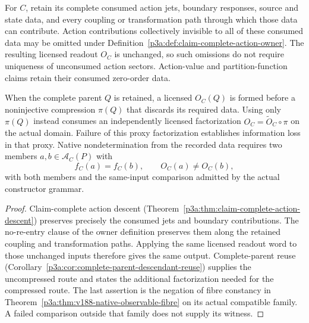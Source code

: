 \documentclass[12pt,a4paper]{article}
\begin{document}
\begin{corollary}
\label{p3a:cor:v188-claim-relative-completeness}
For $C$, retain its complete consumed action jets, boundary responses,
source and state data, and every coupling or transformation path through
which those data can contribute.  Action contributions collectively
invisible to all of these consumed data may be omitted under
Definition~\ref{p3a:def:claim-complete-action-owner}.  The resulting
licensed readout $O_C$ is unchanged, so such omissions do not require
uniqueness of unconsumed action sectors.  Action-value and partition-function
claims retain their consumed zero-order data.

When the complete parent $Q$ is retained, a licensed $O_C(Q)$ is formed
before a noninjective compression $\pi(Q)$ that discards its required data.
Using only $\pi(Q)$ instead consumes an independently licensed factorization
$O_C=\widetilde O_C\circ\pi$ on the actual domain.  Failure of this proxy
factorization establishes information loss in that proxy.  Native
nondetermination from the recorded data requires two members
$a,b\in\mathcal A_C(P)$ with
\[
 f_C(a)=f_C(b),\qquad O_C(a)\ne O_C(b),
\]
with both members and the same-input comparison admitted by the actual
constructor grammar.
\end{corollary}
\begin{proof}
Claim-complete action descent
(Theorem~\ref{p3a:thm:claim-complete-action-descent}) preserves precisely
the consumed jets and boundary contributions.  The no-re-entry clause of
the owner definition preserves them along the retained coupling and
transformation paths.  Applying the same licensed readout word to those
unchanged inputs therefore gives the same output.  Complete-parent reuse
(Corollary~\ref{p3a:cor:complete-parent-descendant-reuse}) supplies the
uncompressed route and states the additional factorization needed for the
compressed route.  The last assertion is the negation of fibre constancy
in Theorem~\ref{p3a:thm:v188-native-observable-fibre} on its actual compatible
family.  A failed comparison outside that family does not supply its witness.
\end{proof}
\end{document}
